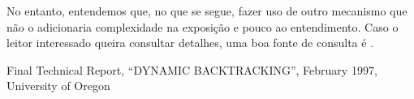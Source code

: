 \documentclass{article}
\begin{document}
No entanto, entendemos que, no que se segue, fazer uso de outro
mecanismo que não o  adicionaria complexidade
na exposição e pouco  ao entendimento. Caso o leitor
interessado queira consultar detalhes, uma boa fonte de consulta é
\cite{dyn}.


\begin{thebibliography}{2}

 Final Technical Report, ``DYNAMIC BACKTRACKING'',
  February 1997, University of Oregon

\end{thebibliography}
\end{document}
